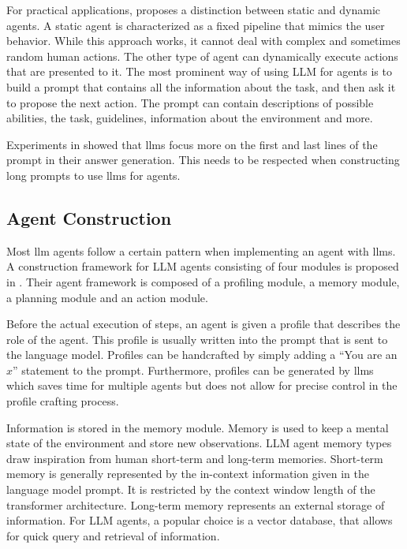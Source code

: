 \documentclass[../main.tex]{subfiles}
\begin{document}
For practical applications, \autocite{Zhu2024} proposes a distinction between static and dynamic agents.
A static agent is characterized as a fixed pipeline that mimics the user behavior.
While this approach works,
it cannot deal with complex and sometimes random human actions.
The other type of agent can dynamically execute actions that are presented to it.
The most prominent way of using LLM for agents
is to build a prompt that contains all the information about the task,
and then ask it to propose the next action.
The prompt can contain descriptions of possible abilities, the task, guidelines,
information about the environment and more.

Experiments in \cite{Liu2023} showed
that \glspl{llm} focus more on the first and last lines of the prompt
in their answer generation.
This needs to be respected when constructing long prompts to use \glspl{llm} for agents.

\subsection{Agent Construction}

Most \gls{llm} agents follow a certain pattern
when implementing an agent with \glspl{llm}.
A construction framework for LLM agents consisting of four modules
is proposed in \cite{Wang2023}.
Their agent framework is composed of a profiling module, a memory module,
a planning module and an action module.

Before the actual execution of steps, an agent is given a profile that describes
the role of the agent.
This profile is usually written into the prompt that is sent to the language model.
Profiles can be handcrafted by simply adding a ``You are an $x$'' statement to the prompt.
Furthermore, profiles can be generated by \glspl{llm} which saves time for multiple agents
but does not allow for precise control in the profile crafting process.

Information is stored in the memory module.
Memory is used to keep a mental state of the environment and store new observations.
LLM agent memory types draw inspiration from human short-term and long-term memories.
Short-term memory is generally represented by the in-context information given in the language model prompt.
It is restricted by the context window length of the transformer architecture.
Long-term memory represents an external storage of information.
For LLM agents, a popular choice is a vector database,
that allows for quick query and retrieval of information.
\end{document}
